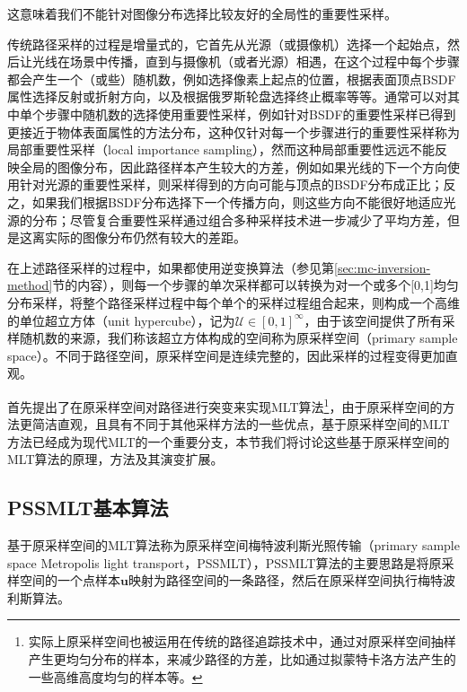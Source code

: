 这意味着我们不能针对图像分布选择比较友好的全局性的重要性采样。

传统路径采样的过程是增量式的，它首先从光源（或摄像机）选择一个起始点，然后让光线在场景中传播，直到与摄像机（或者光源）相遇，在这个过程中每个步骤都会产生一个（或些）随机数，例如选择像素上起点的位置，根据表面顶点BSDF属性选择反射或折射方向，以及根据俄罗斯轮盘选择终止概率等等。通常可以对其中单个步骤中随机数的选择使用重要性采样，例如针对BSDF的重要性采样已得到更接近于物体表面属性的方法分布，这种仅针对每一个步骤进行的重要性采样称为局部重要性采样（local importance sampling），然而这种局部重要性远远不能反映全局的图像分布，因此路径样本产生较大的方差，例如如果光线的下一个方向使用针对光源的重要性采样，则采样得到的方向可能与顶点的BSDF分布成正比；反之，如果我们根据BSDF分布选择下一个传播方向，则这些方向不能很好地适应光源的分布；尽管复合重要性采样通过组合多种采样技术进一步减少了平均方差，但是这离实际的图像分布仍然有较大的差距。

在上述路径采样的过程中，如果都使用逆变换算法（参见第\ref{sec:mc-inversion-method}节的内容），则每一个步骤的单次采样都可以转换为对一个或多个[0,1]均匀分布采样，将整个路径采样过程中每个单个的采样过程组合起来，则构成一个高维的单位超立方体（unit hypercube），记为$\mathcal{U}\in[0,1]^{\infty}$，由于该空间提供了所有采样随机数的来源，我们称该超立方体构成的空间称为原采样空间（primary sample space）。不同于路径空间，原采样空间是连续完整的，因此采样的过程变得更加直观。

\cite{a:ASimpleandRobustMutationStrategyfortheMetropolisLightTransportAlgorithm}首先提出了在原采样空间对路径进行突变来实现MLT算法\footnote{实际上原采样空间也被运用在传统的路径追踪技术中，通过对原采样空间抽样产生更均匀分布的样本，来减少路径的方差，比如通过拟蒙特卡洛方法产生的一些高维高度均匀的样本等。}，由于原采样空间的方法更简洁直观，且具有不同于其他采样方法的一些优点，基于原采样空间的MLT方法已经成为现代MLT的一个重要分支，本节我们将讨论这些基于原采样空间的MLT算法的原理，方法及其演变扩展。





\subsection{PSSMLT基本算法}\label{sec:mlt-pssmlt}
基于原采样空间的MLT算法称为原采样空间梅特波利斯光照传输（primary sample space Metropolis light transport，PSSMLT），PSSMLT算法的主要思路是将原采样空间的一个点样本$\mathbf{u}$映射为路径空间的一条路径，然后在原采样空间执行梅特波利斯算法。

